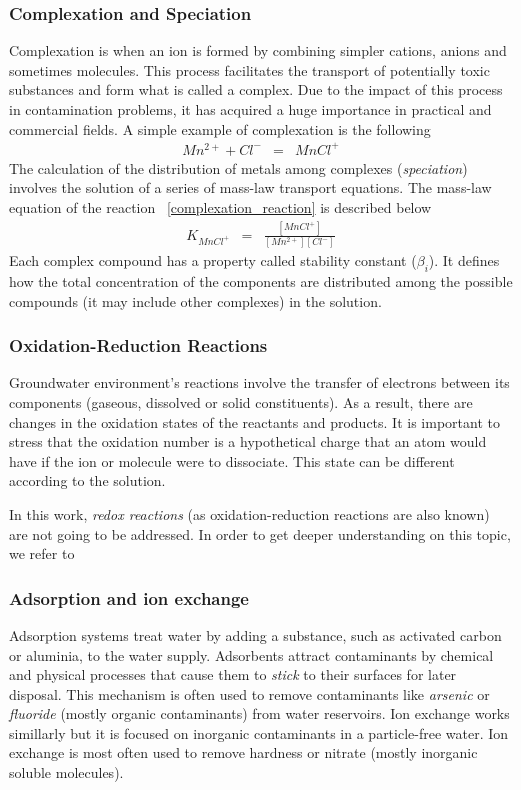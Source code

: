 \documentclass[ppgc,mestrado,English]{iiufrgs}
\begin{document}
\subsubsection{Complexation and Speciation}
Complexation is when an ion is formed by combining simpler cations, anions and sometimes molecules. This process facilitates the transport of potentially toxic substances and form what is called a complex. Due to the impact of this process in contamination problems, it has acquired a huge importance in practical and commercial fields. A simple example of complexation is the following
\begin{eqnarray}\label{complexation_reaction}
Mn^{2+} + Cl^- &=& MnCl^+
\end{eqnarray}
The calculation of the distribution of metals among complexes (\emph{speciation}) involves the solution of a series of mass-law transport equations. The mass-law equation of the reaction ~\ref{complexation_reaction} is described below
\begin{eqnarray}
K_{MnCl^+} &=& \frac{[MnCl^+]}{[Mn^{2+}][Cl^-]}
\end{eqnarray}
Each complex compound has a property called stability constant ($\beta_i$). It defines how the total concentration of the components are distributed among the possible compounds (it may include other complexes) in the solution.

\subsubsection{Oxidation-Reduction Reactions}
Groundwater environment's reactions involve the transfer of electrons between its components (gaseous, dissolved or solid constituents). As a result, there are changes in the oxidation states of the reactants and products. It is important to stress that the oxidation number is a hypothetical charge that an atom would have if the ion or molecule were to dissociate. This state can be different according to the solution. 

In this work, \emph{redox reactions} (as oxidation-reduction reactions are also known) are not going to be addressed. In order to get deeper understanding on this topic, we refer to \cite{Petrucci:07}

\subsubsection{Adsorption and ion exchange}
Adsorption systems treat water by adding a substance, such as activated carbon or aluminia, to the water supply. Adsorbents attract contaminants by chemical and physical processes that cause them to \emph{stick} to their surfaces for later disposal. This mechanism is often used to remove contaminants like \emph{arsenic} or \emph{fluoride} (mostly organic contaminants) from water reservoirs. Ion exchange works simillarly but it is focused on inorganic contaminants in a particle-free water. Ion exchange is most often used to remove hardness or nitrate (mostly inorganic soluble molecules). 
\end{document}
